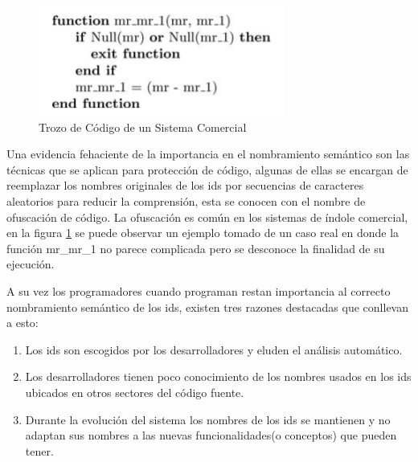 \documentclass[a4paper,12pt]{report}
\begin{document}


\begin{figure}[t] %
\centering
\includegraphics[scale= 0.70]{./idd_1.png}
\caption{Trozo de Código de un Sistema Comercial}
\label{captura2}
\end{figure} 

Una evidencia fehaciente de la importancia en el nombramiento semántico son las técnicas que se aplican para protección de código, algunas de ellas se encargan de reemplazar los nombres originales de los ids por secuencias de caracteres aleatorios 
para reducir la comprensión, esta se conocen con el nombre de ofuscación de código. La ofuscación es común en los sistemas de índole comercial, en la figura \ref{captura2} se puede observar un ejemplo tomado de un caso real en donde la función \textsf{mr\_mr\_1} no parece complicada pero se desconoce la finalidad de su ejecución\cite{DFPM05}.

A su vez los programadores cuando programan restan importancia al correcto nombramiento semántico de los ids, existen tres razones destacadas que conllevan a esto:

\begin{enumerate}
\itemsep0em%
\item Los ids son escogidos por los desarrolladores y eluden el análisis automático.

\item Los desarrolladores tienen poco conocimiento de los nombres usados en los ids ubicados en otros sectores del código fuente.

\item Durante la evolución del sistema los nombres de los ids se mantienen y no adaptan sus nombres a las nuevas funcionalidades(o conceptos) que pueden tener.
\end{enumerate}
\end{document}
